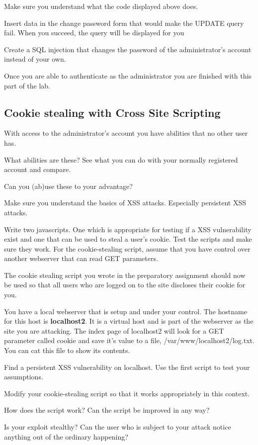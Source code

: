 \documentclass[EITN41]{../tex/cryptosecuritylab}
\begin{document}
\bprepass
\item Make sure you understand what the code displayed above does.
\eprepass

\bprob
\item Insert data in the change password form that would make the UPDATE query fail. When you succeed, the query will be displayed for you
\item Create a SQL injection that changes the password of the administrator's account instead of your own.
\eprob

Once you are able to authenticate as the administrator you are finished with this part of the lab.

\subsection{Cookie stealing with Cross Site Scripting}
With access to the administrator's account you have abilities that no other user has.

\bprob
\item What abilities are these? See what you can do with your normally registered account and compare.
\item Can you (ab)use these to your advantage?
\eprob

\bprepass
\item Make sure you understand the basics of XSS attacks. Especially persistent XSS attacks.
\item Write two javascripts. One which is appropriate for testing if a XSS vulnerability exist and one that can be used to steal a user's cookie. Test the scripts and make sure they work. For the cookie-stealing script, assume that you have control over another webserver that can read GET parameters.
\eprepass

The cookie stealing script you wrote in the preparatory assignment should now be used so that all users who are logged on to the site discloses their cookie for you.

You have a local webserver that is setup and under your control. The hostname for this host is \textbf{localhost2}. It is a virtual host and is part of the webserver as the site you are attacking. The index page of localhost2 will look for a GET parameter called cookie and save it's value to a file, /var/www/localhost2/log.txt. You can cat this file to show its contents.

\bprob
\item Find a persistent XSS vulnerability on localhost. Use the first script to test your assumptions.
\item Modify your cookie-stealing script so that it works appropriately in this context.
\item How does the script work? Can the script be improved in any way?
\item Is your exploit stealthy? Can the user who is subject to your attack notice anything out of the ordinary happening?
\end{document}

